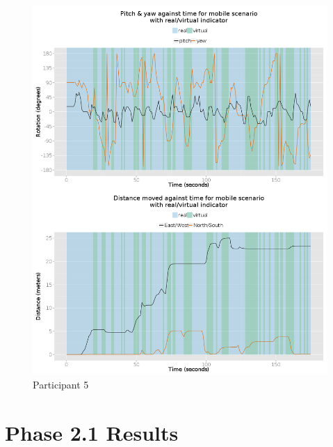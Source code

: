 \begin{figure}[h]
	\begin{center}
		\includegraphics[width=\linewidth]{images/29082014_1350_2up.png}
		\caption{Participant 5}
		\label{participant_5_2up}
	\end{center}
\end{figure}


\clearpage

\section{Phase 2.1 Results}

\lipsum[1]

\lipsum[2]

\lipsum[3]


